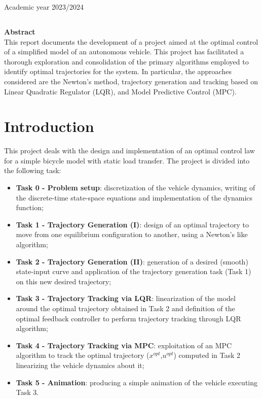 \documentclass[a4paper,11pt,oneside]{book}
\begin{document}
\begin{center}
\vfill
      {\large Academic year \@2023/2024} \\
\end{center}



\newpage
\thispagestyle{empty}

\begin{center}
\chapter*{}
\thispagestyle{empty}
{\Huge \textbf{Abstract}}\\
\vspace{15mm}
This report documents the development of a project aimed at the optimal control of a simplified model of an autonomous vehicle. This project has facilitated a thorough exploration and consolidation of the primary algorithms employed to identify optimal trajectories for the system.
In particular, the approaches considered are the Newton's method, trajectory generation and tracking based on Linear Quadratic Regulator (LQR), and Model Predictive Control (MPC).
\end{center}

\tableofcontents \thispagestyle{empty}

\chapter*{Introduction}
This project deals with the design and implementation of an optimal control law for a simple bicycle model with static load transfer.
The project is divided into the following task:
\begin{itemize}
    \item \textbf{Task 0 - Problem setup}: discretization of the vehicle dynamics, writing of the discrete-time state-space equations and implementation of the dynamics function;
    \item \textbf{Task 1 - Trajectory Generation (I)}: design of an optimal trajectory to move from one equilibrium configuration to another, using a Newton's like algorithm;
    \item \textbf{Task 2 - Trajectory Generation (II)}: generation of a desired (smooth) state\--input curve and application of the trajectory generation task (Task 1) on this new desired trajectory;
    \item \textbf{Task 3 - Trajectory Tracking via LQR}: linearization of the model around the optimal trajectory obtained in Task 2 and definition of the optimal feedback controller to perform trajectory tracking through LQR algorithm;
    \item \textbf{Task 4 - Trajectory Tracking via MPC}: exploitation of an MPC algorithm to track the optimal trajectory ($x^{opt}$,$u^{opt}$) computed in Task 2 linearizing the vehicle dynamics about it;
    \item \textbf{Task 5 - Animation}: producing a simple animation of the vehicle executing Task 3.
\end{itemize}
\end{document}
